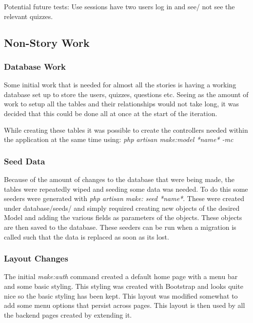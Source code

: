 Potential future tests: Use sessions have two users log in and see/ not see the relevant quizzes.
\newpage

\subsection{Non-Story Work}
\subsubsection{Database Work}
Some initial work that is needed for almost all the stories is having a working database set up to store the users, quizzes, questions etc. Seeing as the amount of work to setup all the tables and their relationships would not take long, it was decided that this could be done all at once at the start of the iteration.

While creating these tables it was possible to create the controllers needed within the application at the same time using: \textit{php artisan make:model *name* -mc } 
\subsubsection{Seed Data}
Because of the amount of changes to the database that were being made, the tables were repeatedly wiped and seeding some data was needed. To do this some seeders were generated with \textit{php artisan make: seed *name*}. These were created under database/seeds/ and simply required creating new objects of the desired Model and adding the various fields as parameters of the objects. These objects are then saved to the database. These seeders can be run when a migration is called such that the data is replaced as soon as its lost.
\subsubsection{Layout Changes}
The initial \textit{make:auth} command created a default home page with a menu bar and some basic styling. This styling was created with Bootstrap and looks quite nice so the basic styling has been kept. This layout was modified somewhat to add some menu options that persist across pages. This layout is then used by all the backend pages created by extending it.
\newpage

